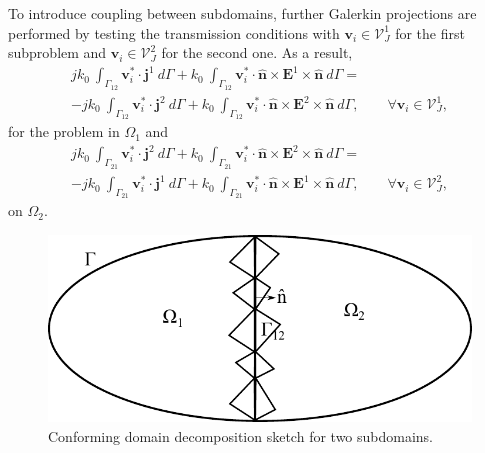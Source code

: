 \noindent To introduce coupling between subdomains, further Galerkin projections are performed by testing the transmission conditions with $\mathbf{v}_i \in \mathcal{V}_J^1$ for the first subproblem and $\mathbf{v}_i \in \mathcal{V}_J^2$ for the second one. As a result,
\begin{multline}
j k_0 \ \int_{\Gamma_{12}} \mathbf{v}_i^* \cdot \mathbf{j}^1 \ d\Gamma + k_0 \ \int_{\Gamma_{12}} \mathbf{v}_i^* \cdot \hat{\mathbf{n}} \times \mathbf{E}^1 \times \hat{\mathbf{n}} \ d\Gamma = \\
- jk_0 \ \int_{\Gamma_{12}} \mathbf{v}_i^* \cdot \mathbf{j}^2 \ d\Gamma + k_0 \
\int_{\Gamma_{12}} \mathbf{v}_i^* \cdot \hat{\mathbf{n}} \times \mathbf{E}^2 \times \hat{\mathbf{n}} \ d\Gamma, \qquad \forall \mathbf{v}_i \in \mathcal{V}_J^1,
\end{multline}
\noindent for the problem in $\Omega_1$ and
\begin{multline}
jk_0 \ \int_{\Gamma_{21}} \mathbf{v}_i^* \cdot \mathbf{j}^2 \ d\Gamma + k_0 \ \int_{\Gamma_{21}} \mathbf{v}_i^* \cdot \hat{\mathbf{n}} \times \mathbf{E}^2 \times \hat{\mathbf{n}} \ d\Gamma = \\
- jk_0 \ \int_{\Gamma_{21}} \mathbf{v}_i^* \cdot \mathbf{j}^1 \ d\Gamma + k_0 \
\int_{\Gamma_{21}} \mathbf{v}_i^* \cdot \hat{\mathbf{n}} \times \mathbf{E}^1 \times \hat{\mathbf{n}} \ d\Gamma, \qquad \forall \mathbf{v}_i \in \mathcal{V}_J^2,
\end{multline}
\noindent on $\Omega_2$.


\begin{figure}[ht!]
\centering
\includegraphics[width=12cm]{DDConforming}
\caption{Conforming domain decomposition sketch for two subdomains.}
\label{fig:DDConforming}
\end{figure}

